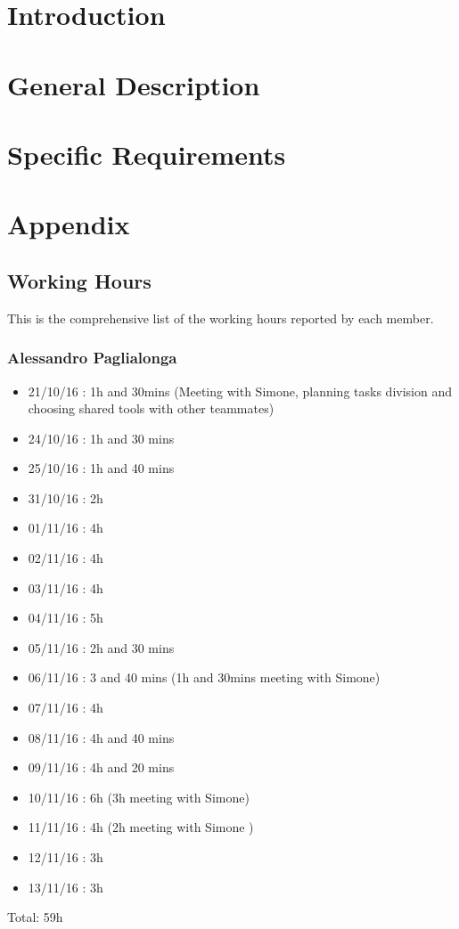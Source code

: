 \maketitle
\clearpage
\tableofcontents

\clearpage
\section{Introduction} \label{Intro}


\clearpage
\section{General Description} \label{Description}


\clearpage
\section{Specific Requirements} \label {Requirements}


\clearpage
\section{Appendix}


\clearpage
\subsection{Working Hours}
This is the comprehensive list of the working hours reported by each member.

\subsubsection{Alessandro Paglialonga}
\begin{itemize}
\item21/10/16 : 1h and 30mins (Meeting with Simone, planning tasks division and choosing shared tools with other teammates)
\item24/10/16 : 1h and 30 mins 
\item25/10/16 : 1h and 40 mins
\item31/10/16 : 2h 
\item01/11/16 : 4h
\item02/11/16 : 4h
\item03/11/16 : 4h
\item04/11/16 : 5h
\item05/11/16 : 2h and 30 mins
\item06/11/16 : 3 and 40 mins (1h and 30mins meeting with Simone)
\item07/11/16 : 4h
\item08/11/16 : 4h and 40 mins
\item09/11/16 : 4h and 20 mins
\item10/11/16 : 6h (3h meeting with Simone)
\item11/11/16 : 4h (2h meeting with Simone )
\item12/11/16 : 3h
\item13/11/16 : 3h
\end{itemize}
Total: 59h


